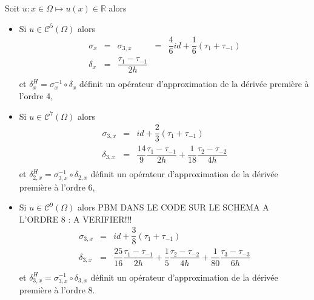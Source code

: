 \begin{corollaire}
Soit $u : x \in \Omega \mapsto u(x) \in \mathbb{R}$ alors 
\begin{itemize}
\item Si $u \in \mathcal{C}^{5}(\Omega)$ alors 
\begin{equation}
\begin{array}{rcccl}
\sigma_{x} &=& \sigma_{3,x} &=& \dfrac{4}{6} id + \dfrac{1}{6} \left( \tau_1 + \tau_{-1} \right)\\
\delta_{x} &=& \dfrac{\tau_1 - \tau_{-1}}{2h} &&\\ 
\end{array}
\label{eq:comp4}
\end{equation}
et $\delta^H_x = \sigma_x^{-1} \circ \delta_x$ définit un opérateur d'approximation de la dérivée première à l'ordre 4,

\item Si $u \in \mathcal{C}^{7}(\Omega)$ alors 
\begin{equation}
\begin{array}{rcl}
\sigma_{3,x} &=& id + \dfrac{2}{3}\left( \tau_1 + \tau_{-1} \right) \\
\delta_{3,x} &=& \dfrac{14}{9} \dfrac{\tau_1 - \tau_{-1}}{2h} + \dfrac{1}{18} \dfrac{\tau_2 - \tau_{-2}}{4h}\\ 
\end{array}
\label{eq:comp6}
\end{equation}
et $\delta^H_{2,x} = \sigma_{3,x}^{-1} \circ \delta_{2,x}$ définit un opérateur d'approximation de la dérivée première à l'ordre 6,


\item Si $u \in \mathcal{C}^{9}(\Omega)$ alors 
PBM DANS LE CODE SUR LE SCHEMA A L'ORDRE 8 : A VERIFIER!!!
\begin{equation}
\begin{array}{rcl}
\sigma_{3,x} &=& id + \dfrac{3}{8}\left( \tau_1 + \tau_{-1} \right) \\
\delta_{3,x} &=& \dfrac{25}{16} \dfrac{\tau_1 - \tau_{-1}}{2h} + \dfrac{1}{5} \dfrac{\tau_2 - \tau_{-2}}{4h} + \dfrac{1}{80} \dfrac{\tau_3 - \tau_{-3}}{6h} \\ 
\end{array}
\label{eq:comp8}
\end{equation}
et $\delta^H_{3,x} = \sigma_{3,x}^{-1} \circ \delta_{3,x}$ définit un opérateur d'approximation de la dérivée première à l'ordre 8.

\end{itemize}
\end{corollaire}


